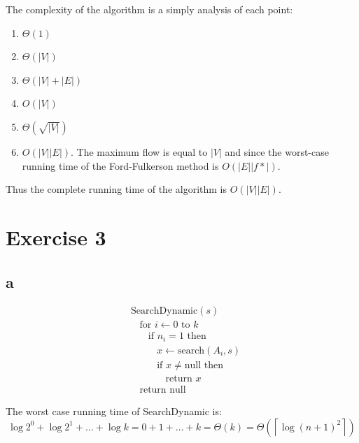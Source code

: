 \documentclass[koma,a4paper]{article}
\begin{document}
The complexity of the algorithm is a simply analysis of each point:

\begin{enumerate}
  \item $\Theta(1)$
  \item $\Theta\left(|V|\right)$
  \item $\Theta\left(|V| + |E|\right)$
  \item $O(|V|)$
  \item $\Theta\left(\sqrt{|V|}\right)$
  \item $O\left(|V||E|\right)$. The maximum flow is equal to $|V|$ and since the worst-case running time of the Ford-Fulkerson method is $O\left(|E||f*|\right)$.
\end{enumerate}

Thus the complete running time of the algorithm is $O\left(|V||E|\right)$.

\section{Exercise 3}
\subsection{a}
\begin{align*}
  &\text{SearchDynamic}(s)\\
  &~~~~\text{for } i \leftarrow 0 \text{ to } k\\
  &~~~~~~~~\text{if } n_i = 1 \text{ then}\\
  &~~~~~~~~~~~~x \leftarrow \text{search}(A_i, s)\\
  &~~~~~~~~~~~~\text{if } x \neq \text{null} \text{ then}\\
  &~~~~~~~~~~~~~~~~\text{return } x\\
  &~~~~\text{return null}
\end{align*}

The worst case running time of SearchDynamic is: $$\log{2}^0 + \log{2}^1 + \dots + \log{k} = 0 + 1 + \dots + k = \Theta\left(k\right) = \Theta\left(\left\lceil\log{(n+1)}^2\right\rceil\right)$$
\end{document}
